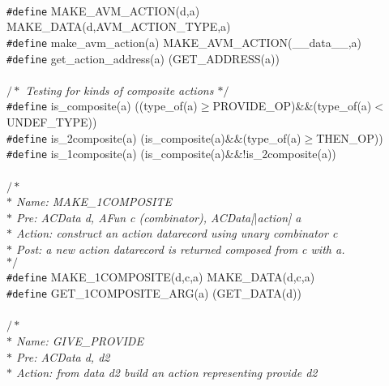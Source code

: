 \begin{flushleft}
\mbox{}\\
{\tt \#define} MAKE\_AVM\_ACTION(d,a) MAKE\_DATA(d,AVM\_ACTION\_TYPE,a)\mbox{}\\
{\tt \#define} make\_avm\_action(a) MAKE\_AVM\_ACTION(\_\_data\_\_,a)\mbox{}\\
{\tt \#define} get\_action\_address(a) (GET\_ADDRESS(a))\mbox{}\\
\mbox{}\\
{$/\ast$\it{} Testing for kinds of composite actions $\ast/$}\mbox{}\\
{\tt \#define} is\_composite(a) ((type\_of(a)$\geq$PROVIDE\_OP)\&\&(type\_of(a)$<$UNDEF\_TYPE))\mbox{}\\
{\tt \#define} is\_2composite(a) (is\_composite(a)\&\&(type\_of(a)$\geq$THEN\_OP))\mbox{}\\
{\tt \#define} is\_1composite(a) (is\_composite(a)\&\&!is\_2composite(a))\mbox{}\\
\mbox{}\\
{$/\ast$\it{}\mbox{}\\
\hspace*{1\indentation}$\ast$ Name: MAKE\_1COMPOSITE\mbox{}\\
\hspace*{1\indentation}$\ast$ Pre: ACData d, AFun c (combinator), ACData[$\mid$action] a\mbox{}\\
\hspace*{1\indentation}$\ast$ Action: construct an action datarecord using unary combinator c\mbox{}\\
\hspace*{1\indentation}$\ast$ Post: a new action datarecord is returned composed from c with a.\mbox{}\\
\hspace*{1\indentation}$\ast/$}\mbox{}\\
{\tt \#define} MAKE\_1COMPOSITE(d,c,a) MAKE\_DATA(d,c,a)\mbox{}\\
{\tt \#define} GET\_1COMPOSITE\_ARG(a) (GET\_DATA(d))\mbox{}\\
\mbox{}\\
{$/\ast$\it{}\mbox{}\\
\hspace*{1\indentation}$\ast$ Name: GIVE\_PROVIDE\mbox{}\\
\hspace*{1\indentation}$\ast$ Pre: ACData d, d2\mbox{}\\
\hspace*{1\indentation}$\ast$ Action: from data d2 build an action representing provide d2\mbox{}\\
}
\end{flushleft}
